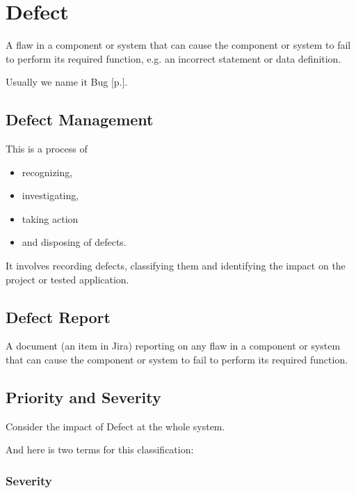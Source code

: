 \section{Defect}
\label{sec:Defect}

A flaw in a component or system that can cause the component or system to fail to perform its required function, e.g. an incorrect statement or data definition.

Usually we name it Bug [p.\pageref{sec:Bug}].

\subsection{Defect Management}
\label{sec:Defect Management}

This is a process of

\begin{itemize}
\item 
    recognizing,
\item 
investigating,
\item 
taking action
\item 
and disposing of defects.                             \end{itemize}

It involves recording defects, classifying them and identifying the impact on the project or tested application.

\subsection{Defect Report}
\label{sec:Defect Report}

A document (an item in Jira) reporting on any flaw in a component or system that can cause the component or system to fail to perform its required function.

\subsection{Priority and Severity}
\label{sec:Priority and Severity}

Consider the impact of Defect at the whole system. 

And here is two terms for this classification: 

\subsubsection{Severity}
\label{sec:Severity}

